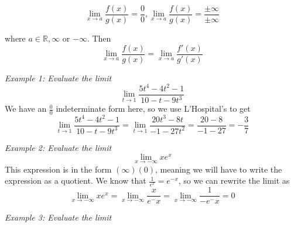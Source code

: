 \documentclass{article}
\begin{document}
            \begin{equation*}
                \lim_{x\to a}\frac{f(x)}{g(x)}=\frac{0}{0}, \lim_{x\to a}\frac{f(x)}{g(x)}=\frac{\pm\infty}{\pm\infty}
            \end{equation*}

            \noindent where $a\in\mathbb{R}, \infty$ or $-\infty$. Then \\

            \begin{equation*}
                \lim_{x\to a}\frac{f(x)}{g(x)}=\lim_{x\to a}\frac{f'(x)}{g'(x)}
            \end{equation*}

            \noindent \color{blue} \textit{Example 1: Evaluate the limit} \\

            \begin{equation*}
                \lim_{t\to 1}\frac{5t^4-4t^2-1}{10-t-9t^3}
            \end{equation*}
            \color{black} We have an $\frac{0}{0}$ indeterminate form here, so we use L'Hospital's to get \\

            \begin{equation}
                \lim_{t\to 1}\frac{5t^4-4t^2-1}{10-t-9t^3}=\lim_{t\to 1}\frac{20t^3-8t}{-1-27t^2}
                =\frac{20-8}{-1-27}=-\frac{3}{7}
            \end{equation}

            \noindent \color{blue} \textit{Example 2: Evaluate the limit} \\

            \begin{equation*}
                \lim_{x\to-\infty}xe^x
            \end{equation*}
            \color{black} This expression is in the form $(\infty)(0)$, meaning we will have to write
            the expression as a quotient. We know that $\frac{1}{e^x}=e^{-x}$, so we can rewrite the
            limit as \\

            \begin{equation*}
                \lim_{x\to-\infty}xe^x=\lim_{x\to-\infty}\frac{x}{e^-x}=\lim_{x\to-\infty} \frac{1}{-e^-x}=0
            \end{equation*}

            \noindent \color{blue} \textit{Example 3: Evaluate the limit} \\
\end{document}
